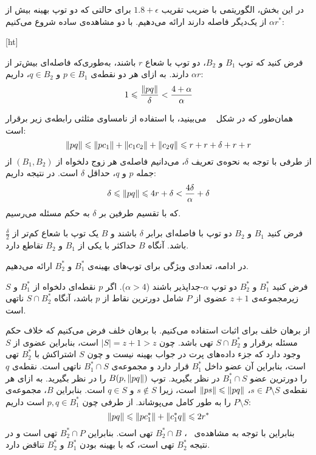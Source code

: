در این بخش، الگوریتمی با ضریب تقریب $1.8 + \epsilon$ برای حالتی که دو توپ بهینه بیش از$\alpha r^*$ از یک‌دیگر فاصله دارند ارائه می‌دهیم.
با دو مشاهده‌ی ساده شروع می‌کنیم:


[ht]

فرض کنید که توپ $B_1$ و $B_2$، دو توپ با شعاع $r$ باشند، به‌طوری‌که فاصله‌ای بیش‌تر از $\alpha r$ دارند.
به ازای هر دو نقطه‌ی $p \in B_1$ و $q \in B_2$، داریم:
$$1 \leqslant \frac{\|{pq}\|}{\delta} < \frac{4 + \alpha}{\alpha}$$


همان‌طور که در شکل ~ می‌بینید، با استفاده از نامساوی مثلثی رابطه‌ی زیر برقرار است:
$$\|{pq}\| \leqslant \|{pc_1}\| + \|{c_1c_2}\| + \|{c_2 q}\| \leqslant r + r + \delta + r + r$$ 
از‌ طرفی با توجه به نحوه‌ی تعریف $\delta$، می‌دانیم فاصله‌ی هر زوج دلخواه از $(B_1, B_2)$ از جمله $p$ و $q$، حداقل $\delta$ است. در نتیجه داریم:
$$\delta \leqslant \|{pq}\| \leqslant 4r + \delta < \frac{4\delta}{\alpha} + \delta$$
که با تقسیم طرفین بر $\delta$ به حکم مسئله می‌رسیم.



فرض کنید $B_1$ و $B_2$ دو توپ با فاصله‌ای برابر $\delta$ باشند و $B$ یک توپ با شعاع کم‌‌تر از $\frac{\delta}{2}$ باشد.
آنگاه $B$ حداکثر با یکی از $B_1$ و $B_2$ تقاطع دارد.


در ادامه، تعدادی ویژگی برای توپ‌های بهینه‌ی $B_1^*$ و $B_2^*$ ارائه می‌دهیم.


فرض کنید $B_1^*$ و $B_2^*$ دو توپ $\alpha$-جداپذیر باشند ($\alpha > 4$).
اگر $p$ نقطه‌ای دلخواه از $B_1^*$ و $S$ زیرمجموعه‌ی $z+1$ عضوی از $P$ شامل دورترین نقاط از $p$ باشد، آنگاه $S \cap B_2^*$ ناتهی است.


از برهان خلف برای اثبات استفاده می‌کنیم.
با برهان خلف فرض می‌کنیم که خلاف حکم مسئله برقرار و $S \cap B_2^*$ تهی باشد.
چون $|S| = z+1 > z$ است، بنابراین عضوی از‌ $S$ وجود دارد که جزء داده‌های پرت در جواب بهینه نیست و چون $S$ اشتراکش با $B_2^*$ تهی است، بنابراین آن عضو داخل $B_1^*$ قرار دارد و مجموعه‌ی $B_1^* \cap S$ ناتهی است.
نقطه‌ی $q$ را دورترین عضو $B_1^* \cap S$ در نظر بگیرید.
توپ $B(p, \|{pq}\|)$ را در نظر بگیرید. به ازای هر نقطه‌ی $s \in P \setminus S$، $\|{ps}\| \leqslant \|{pq}\|$ است، زیرا $s \not \in S$ و $q \in S$ است.
بنابراین $B$، مجموعه‌ی $P \setminus S$ را به طور کامل می‌پوشاند.
از طرفی چون $p, q \in B_1^*$ است داریم:
$$\|{pq}\| \leqslant \|{pc_1^*}\| + \|{c_1^* q}\| \leqslant 2r^*$$
بنابراین با توجه به مشاهده‌ی ~، $B_2^* \cap B$ تهی است.
بنابراین $B_2^* \cap P$ تهی است و در نتیجه $B_2^*$ تهی است، که با بهینه بودن $B_1^*$ و $B_2^*$ تناقض دارد.

